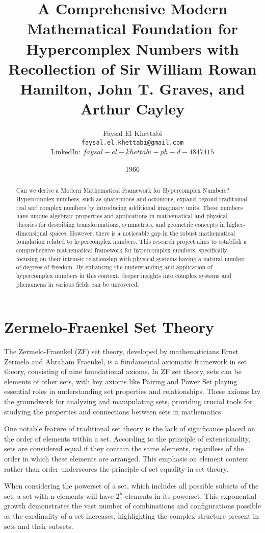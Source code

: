 \documentclass{article}
\title{A Comprehensive Modern Mathematical Foundation for Hypercomplex Numbers with Recollection of Sir William Rowan Hamilton, John T. Graves, and Arthur Cayley }
\author{Faysal El Khettabi \\
\texttt{faysal.el.khettabi@gmail.com} \\
LinkedIn: $faysal-el-khettabi-ph-d-4847415$ 
}
\date{1966}
\begin{document}
\maketitle

\begin{abstract}
Can we derive a Modern Mathematical Framework for Hypercomplex Numbers? \\ 
Hypercomplex numbers, such as quaternions and octonions, expand beyond traditional real and complex numbers by introducing additional imaginary units. These numbers have unique algebraic properties and applications in mathematical and physical theories for describing transformations, symmetries, and geometric concepts in higher-dimensional spaces. However, there is a noticeable gap in the robust mathematical foundation related to hypercomplex numbers. This research project aims to establish a comprehensive mathematical framework for hypercomplex numbers, specifically focusing on their intrinsic relationship with physical systems having a natural number of degrees of freedom. By enhancing the understanding and application of hypercomplex numbers in this context, deeper insights into complex systems and phenomena in various fields can be uncovered.
\end{abstract}

\section{Zermelo-Fraenkel Set Theory}

The Zermelo-Fraenkel (ZF) set  theory, developed by mathematicians Ernst Zermelo and Abraham Fraenkel, is a fundamental axiomatic framework in set theory, consisting of nine foundational axioms. In ZF set theory, sets can be elements of other sets, with key axioms like Pairing and Power Set playing essential roles in understanding set properties and relationships. These axioms lay the groundwork for analyzing and manipulating sets, providing crucial tools for studying the properties and connections between sets in mathematics.

One notable feature of traditional set theory is the lack of significance placed on the order of elements within a set.
According to the principle of extensionality, sets are considered equal if they contain the same elements, regardless of the order in which these elements are arranged. This emphasis on element content rather than order underscores the principle of set equality in set theory.

When considering the powerset of a set, which includes all possible subsets of the set, a set with n elements will have $2^n$ elements in its powerset. This exponential growth demonstrates the vast number of combinations and configurations possible as the cardinality of a set increases, highlighting the complex structure present in sets and their subsets.
\end{document}
